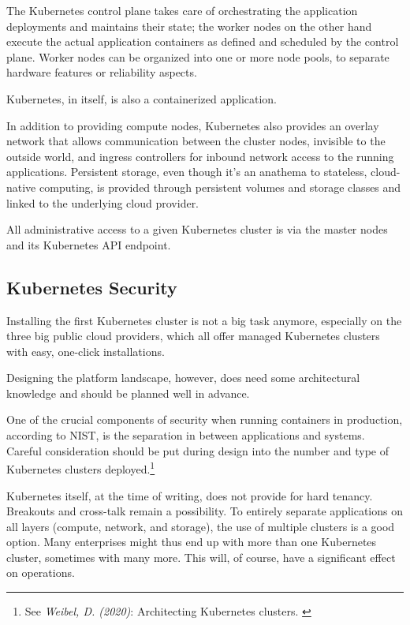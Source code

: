 The Kubernetes control plane takes care of orchestrating the application deployments and maintains their state; the worker nodes on the other hand execute the actual application containers as defined and scheduled by the control plane. Worker nodes can be organized into one or more node pools, to separate hardware features or reliability aspects.

Kubernetes, in itself, is also a containerized application.

In addition to providing compute nodes, Kubernetes also provides an overlay network that allows communication between the cluster nodes, invisible to the outside world, and ingress controllers for inbound network access to the running applications. Persistent storage, even though it's an anathema to stateless, cloud-native computing, is provided through persistent volumes and storage classes and linked to the underlying cloud provider.

All administrative access to a given Kubernetes cluster is via the master nodes and its Kubernetes API endpoint.

\subsection{Kubernetes Security}

Installing the first Kubernetes cluster is not a big task anymore, especially on the three big public cloud providers, which all offer managed Kubernetes clusters with easy, one-click installations.

Designing the platform landscape, however, does need some architectural knowledge and should be planned well in advance.

One of the crucial components of security when running containers in production, according to NIST, is the separation in between applications and systems. Careful consideration should be put during design into the number and type of Kubernetes clusters deployed.\footnote{See \textit{Weibel, D. (2020)}: Architecting Kubernetes clusters. \cite{howMany}}

Kubernetes itself, at the time of writing, does not provide for hard tenancy. Breakouts and cross-talk remain a possibility. To entirely separate applications on all layers (compute, network, and storage), the use of multiple clusters is a good option. Many enterprises might thus end up with more than one Kubernetes cluster, sometimes with many more. This will, of course, have a significant effect on operations.

